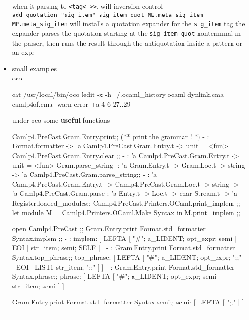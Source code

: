 \begin{itemize}
\begin{bluecode}
\end{bluecode}


  when it parsing to \verb|<tag< >>|, will inversion control \\
   \verb|add_quotation "sig_item" sig_item_quot ME.meta_sig_item MP.meta_sig_item|
   will  installs a quotation expander for the \verb|sig_item| tag
   the expander parses the quotation starting at the \verb|sig_item_quot|
   nonterminal in the parser, then runs the result through the antiquotation
   inside a pattern or an expr 

 \item small examples \\
   {\color{red} oco}
   

\begin{bluecode}
cat /usr/local/bin/oco
ledit -x -h ~/.ocaml_history ocaml dynlink.cma camlp4of.cma -warn-error +a-4-6-27..29
\end{bluecode}


   under oco some \textbf{useful} functions


\begin{bluecode}
Camlp4.PreCast.Gram.Entry.print;; (** print the grammar ! *)
- : Format.formatter -> 'a Camlp4.PreCast.Gram.Entry.t -> unit = <fun>
Camlp4.PreCast.Gram.Entry.clear ;;
- : 'a Camlp4.PreCast.Gram.Entry.t -> unit = <fun>
Gram.parse_string
-: 'a Gram.Entry.t -> Gram.Loc.t -> string -> 'a 
Camlp4.PreCast.Gram.parse_string;;
- : 'a Camlp4.PreCast.Gram.Entry.t ->
    Camlp4.PreCast.Gram.Loc.t -> string -> 'a
Camlp4.PreCast.Gram.parse : 'a Entry.t -> Loc.t -> char Stream.t -> 'a
Register.loaded_modules;;
Camlp4.PreCast.Printers.OCaml.print_implem ;;
let module M = Camlp4.Printers.OCaml.Make Syntax in M.print_implem ;;
\end{bluecode}


   

\begin{bluecode}
open Camlp4.PreCast ;;
Gram.Entry.print Format.std_formatter Syntax.implem ;;
- : 
implem: [ LEFTA
  [ "#"; a_LIDENT; opt_expr; semi
  | EOI
  | str_item; semi; SELF ] ]
- : 
Gram.Entry.print Format.std_formatter Syntax.top_phrase;;
top_phrase: [ LEFTA
  [ "#"; a_LIDENT; opt_expr; ";;"
  | EOI
  | LIST1 str_item; ";;" ] ]
- : 
Gram.Entry.print Format.std_formatter Syntax.phrase;;
phrase: [ LEFTA
  [ "#"; a_LIDENT; opt_expr; semi
  | str_item; semi ] ]

Gram.Entry.print Format.std_formatter Syntax.semi;;
semi: [ LEFTA
  [ ";;"
  |  ] ]


\end{bluecode}
\end{itemize}
